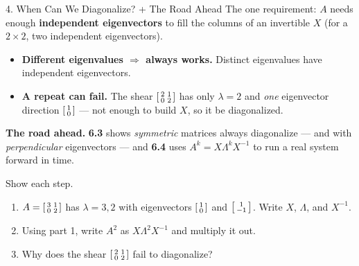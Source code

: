 \documentclass[10pt]{article}
\begin{document}
\begin{notesbox}{4. When Can We Diagonalize? + The Road Ahead}
The one requirement: $A$ needs enough \textbf{independent eigenvectors} to fill the columns of an
invertible $X$ (for a $2\times2$, two independent eigenvectors).
\begin{itemize}\setlength{\itemsep}{2pt}
  \item \textbf{Different eigenvalues $\Rightarrow$ always works.} Distinct eigenvalues have independent eigenvectors.
  \item \textbf{A repeat can fail.} The shear $\begin{bsmallmatrix}2&1\\0&2\end{bsmallmatrix}$ has only $\lambda=2$
        and \emph{one} eigenvector direction $\begin{bsmallmatrix}1\\0\end{bsmallmatrix}$ --- not enough to build $X$, so it \blank{2.6cm} be diagonalized.
\end{itemize}

\vspace{3pt}
\textbf{The road ahead.} \textbf{6.3} shows \emph{symmetric} matrices always diagonalize --- and with
\emph{perpendicular} eigenvectors --- and \textbf{6.4} uses $A^k=X\Lambda^k X^{-1}$ to run a real system
forward in time.
\end{notesbox}

\begin{practicebox}
Show each step.
\begin{enumerate}[leftmargin=1.6em, itemsep=6pt]
  \item $A=\begin{bsmallmatrix} 3 & 1\\ 0 & 2 \end{bsmallmatrix}$ has $\lambda=3,2$ with eigenvectors $\begin{bsmallmatrix}1\\0\end{bsmallmatrix}$ and $\begin{bsmallmatrix}1\\-1\end{bsmallmatrix}$. Write $X$, $\Lambda$, and $X^{-1}$. 
  \item Using part 1, write $A^2$ as $X\Lambda^2 X^{-1}$ and multiply it out. \writeline
  \item Why does the shear $\begin{bsmallmatrix}2&1\\0&2\end{bsmallmatrix}$ fail to diagonalize? \writeline
\end{enumerate}
\end{practicebox}
\end{document}

